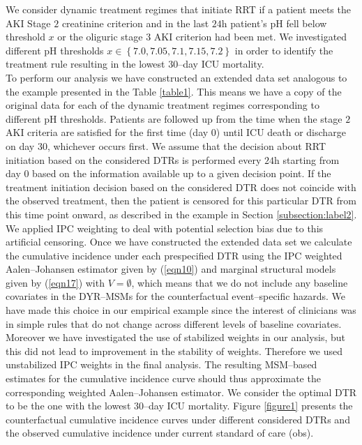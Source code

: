 \documentclass[12pt]{article}
\begin{document}
We consider dynamic treatment regimes that initiate RRT if a patient meets the AKI Stage $2$ creatinine criterion and in the last $24$h patient's pH fell below threshold $x$ or the oliguric stage $3$ AKI criterion had been met. We investigated different pH thresholds $x \in \left\lbrace 7.0, 7.05, 7.1, 7.15, 7.2 \right\rbrace$ in order to identify the treatment rule resulting in the lowest $30$--day ICU mortality.  
\\
\indent
To perform our analysis we have constructed an extended data set analogous to the example presented in the Table \ref{table1}. This means we have a copy of the original data for each of the dynamic treatment regimes corresponding to different pH thresholds. Patients are followed up from the time when the stage $2$ AKI criteria are satisfied for the first time (day $0$) until ICU death or discharge on day $30$, whichever occurs first. We assume that the decision about RRT initiation based on the considered DTRs is performed every $24$h starting from day $0$ based on the information available up to a given decision point. If the treatment initiation decision based on the considered DTR does not coincide with the observed treatment, then the patient is censored for this particular DTR from this time point onward, as described in the example in Section \ref{subsection:label2}. We applied IPC weighting to deal with potential selection bias due to this artificial censoring. Once we have constructed the extended data set we calculate the cumulative incidence under each prespecified DTR using the IPC weighted Aalen--Johansen estimator given by (\ref{eqn10}) and marginal structural models given by (\ref{eqn17}) with $V = \emptyset$, which means that we do not include any baseline covariates in the DYR--MSMs for the counterfactual event--specific hazards. We have made this choice in our empirical example since the interest of clinicians was in simple rules that do not change across different levels of baseline covariates. Moreover we have investigated the use of stabilized weights in our analysis, but this did not lead to improvement in the stability of weights. Therefore we used unstabilized IPC weights in the final analysis. The resulting MSM--based estimates for the cumulative incidence curve should thus approximate the corresponding weighted Aalen--Johansen estimator. We consider the optimal DTR to be the one with the lowest $30$--day ICU mortality. Figure \ref{figure1} presents the counterfactual cumulative incidence curves under different considered DTRs and the observed cumulative incidence under current standard of care (obs). 
\end{document}
